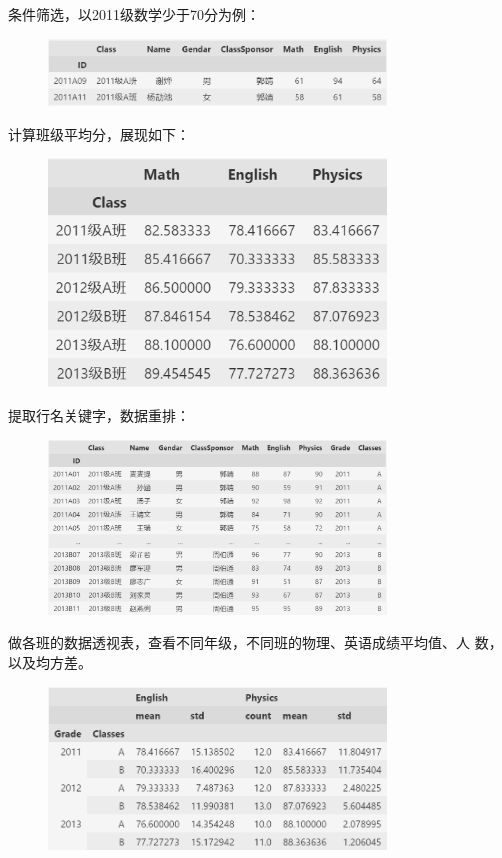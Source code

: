 \documentclass[10pt,a4paper,twoside,UTF8]{ctexart}
\begin{document}
条件筛选，以2011级数学少于70分为例：
\begin{figure}[H]
	\centering
	\includegraphics[width=0.8\textwidth]{img//table3.png}
	\label{fig:table3}
\end{figure}
计算班级平均分，展现如下：
\begin{figure}[H]
	\centering
	\includegraphics[width=0.8\textwidth]{img//table4.png}
	\label{fig:table4}
\end{figure}
提取行名关键字，数据重排：
\begin{figure}[H]
	\centering 
	\includegraphics[width=0.8\textwidth]{img//table5.png}
	\label{fig:table5}
\end{figure}
做各班的数据透视表，查看不同年级，不同班的物理、英语成绩平均值、人
数，以及均方差。
\begin{figure}[H]
	\centering
	\includegraphics[width=0.8\textwidth]{img//table6.png}
	\label{fig:table6}
\end{figure}
\end{document}
